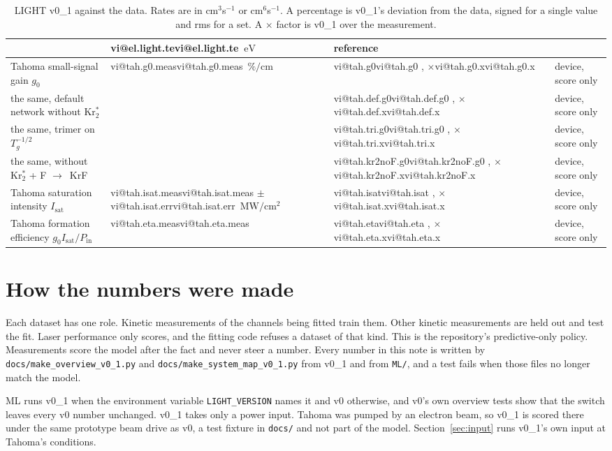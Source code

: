 \documentclass[11pt]{article}
\makeatletter
\newcommand\vi[1]{\ifcsname vi@#1\endcsname\csname vi@#1\endcsname
  \else\errmessage{no overview number '#1'. Rerun make_overview_v0_1.py}\fi}
\newcommand{\unit}[1]{\ensuremath{\,\mathrm{#1}}}
\newcommand{\Krts}{Kr\ensuremath{_2^*}}
\newcommand{\ra}{\ensuremath{\to}\ }
\newcommand{\gIP}{\ensuremath{g_0I_\mathrm{sat}/P_\mathrm{in}}}
\newcommand{\x}[1]{\ensuremath{\times}#1}
\makeatother
\begin{document}
\begin{table}[h]
\begin{tabularx}{\linewidth}{@{}>{\raggedright\arraybackslash}X
  >{\raggedright\arraybackslash}p{2.6cm}>{\raggedright\arraybackslash}p{2.5cm}
  >{\raggedright\arraybackslash}p{2.5cm}@{}}
  & \vi{el.light.te}\unit{eV} & reference\\
\midrule
Tahoma small-signal gain $g_0$ & \vi{tah.g0.meas}\unit{\%/cm} &
  \vi{tah.g0}, \x{\vi{tah.g0.x}} & device, score only\\
\quad the same, default network without \Krts & & \vi{tah.def.g0},
  \x{\vi{tah.def.x}} & device, score only\\
\quad the same, trimer on $T_g^{-1/2}$ & & \vi{tah.tri.g0},
  \x{\vi{tah.tri.x}} & device, score only\\
\quad the same, without \Krts{} + F \ra KrF & & \vi{tah.kr2noF.g0},
  \x{\vi{tah.kr2noF.x}} & device, score only\\
Tahoma saturation intensity $I_\mathrm{sat}$ & \vi{tah.isat.meas} $\pm$
  \vi{tah.isat.err}\unit{MW/cm^2} & \vi{tah.isat}, \x{\vi{tah.isat.x}} &
  device, score only\\
Tahoma formation efficiency \gIP & \vi{tah.eta.meas} & \vi{tah.eta},
  \x{\vi{tah.eta.x}} & device, score only\\
\bottomrule
\end{tabularx}
\caption{LIGHT v0\_1 against the data. Rates are in cm$^3$s$^{-1}$ or
cm$^6$s$^{-1}$. A percentage is v0\_1's deviation from the data, signed
for a single value and rms for a set. A \x{} factor is v0\_1 over the
measurement.}
\label{tab:score}
\end{table}

\section{How the numbers were made}

Each dataset has one role. Kinetic measurements of the channels being
fitted train them. Other kinetic measurements are held out and test the
fit. Laser performance only scores, and the fitting code refuses a dataset
of that kind. This is the repository's predictive-only policy. Measurements
score the model after the fact and never steer a number. Every number in
this note is written by \texttt{docs/make\_overview\_v0\_1.py} and
\texttt{docs/make\_system\_map\_v0\_1.py} from v0\_1 and from \texttt{ML/},
and a test fails when those files no longer match the model.

ML runs v0\_1 when the environment variable \texttt{LIGHT\_VERSION} names
it and v0 otherwise, and v0's own overview tests show that the switch
leaves every v0 number unchanged. v0\_1 takes only a power input. Tahoma
was pumped by an electron beam, so v0\_1 is scored there under the same
prototype beam drive as v0, a test fixture in \texttt{docs/} and not part
of the model. Section~\ref{sec:input} runs v0\_1's own input at Tahoma's
conditions.
\end{document}
